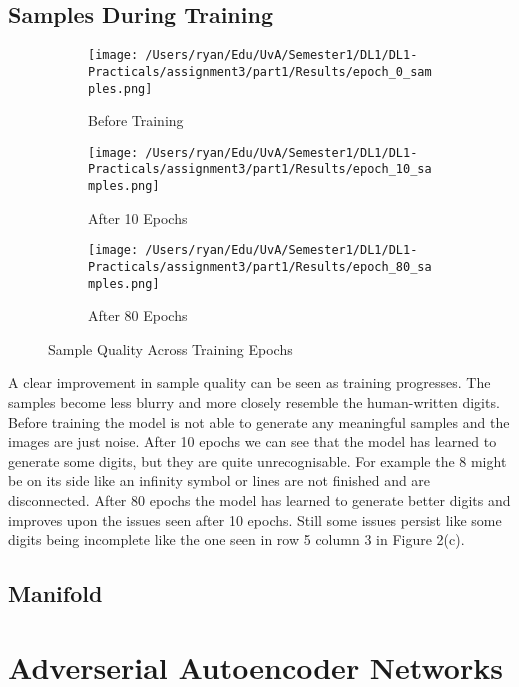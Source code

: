 \documentclass[a4paper]{article}
\begin{document}
\subsection{Samples During Training}
\begin{figure}[htbp]
    \centering
    \begin{subfigure}[b]{0.3\textwidth}
        \texttt{[image: /Users/ryan/Edu/UvA/Semester1/DL1/DL1-Practicals/assignment3/part1/Results/epoch\_0\_samples.png]}
        \caption{Before Training}
        \label{fig:epoch0}
    \end{subfigure}
    \hfill
    \begin{subfigure}[b]{0.3\textwidth}
        \texttt{[image: /Users/ryan/Edu/UvA/Semester1/DL1/DL1-Practicals/assignment3/part1/Results/epoch\_10\_samples.png]}
        \caption{After 10 Epochs}
        \label{fig:epoch10}
    \end{subfigure}
    \hfill
    \begin{subfigure}[b]{0.3\textwidth}
        \texttt{[image: /Users/ryan/Edu/UvA/Semester1/DL1/DL1-Practicals/assignment3/part1/Results/epoch\_80\_samples.png]}
        \caption{After 80 Epochs}
        \label{fig:epoch80}
    \end{subfigure}
    \caption{Sample Quality Across Training Epochs}
    \label{fig:three_epochs}
\end{figure}
A clear improvement in sample quality can be seen as training progresses. The samples become less blurry and more
closely resemble the human-written digits. Before training the model is not able to generate any meaningful samples
and the images are just noise. After 10 epochs we can see that the model has learned to generate some digits, but
they are quite unrecognisable. For example the 8 might be on its side like an infinity symbol or lines are not finished
and are disconnected. After 80 epochs the model has learned to generate better digits and improves upon the issues
seen after 10 epochs. Still some issues persist like some digits being incomplete like the one seen in row 5 column 3
in Figure 2(c).

\subsection{Manifold}
\bigskip
\newpage

\section{Adverserial Autoencoder Networks}
\end{document}
